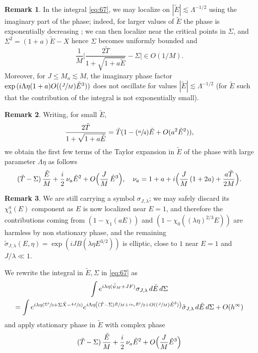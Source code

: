 \documentclass[JEP,XML,SOM,Unicode,NoEqCountersInSection,NoFloatCountersInSection,published]{cedram}
\newcommand{\Psfrac}[2]{(\sfrac{#1}{#2})}
\theoremstyle{plain}
\theoremstyle{definition}
\newtheorem{rmq}{Remark}[section]
\begin{document}
\begin{rmq}\label{rmkimagphase}
In the integral \eqref{eq:67}, we may localize on $|{\tilde E}|\lesssim\Lambda^{-1/2}$ using the imaginary part of the phase; indeed, for larger values of ${\tilde E}$ the phase is exponentially decreasing ; we can then localize near the critical points in $\Sigma$, and $\Sigma^{2}=(1+a){\tilde E}-X$ hence $\Sigma$ becomes uniformly bounded and
\[
\frac 1M\biggl|\frac{2\tilde T}{1+\sqrt{1+a{\tilde E}}}-\Sigma\biggr| \in O(1/M).
\]
Moreover, for $J\leq M_a\lesssim M$, the imaginary phase factor $\exp{(i\Lambda\eta(1+a)O(\Psfrac JM {\tilde E}^3)})$ does not oscillate for values $|{\tilde E}|\lesssim \Lambda^{-1/2}$ (\ie for ${\tilde E}$ such that the contribution of the integral is not exponentially small).
\end{rmq}
\begin{rmq}
Writing, for small ${\tilde E}$,
\[
\frac{2\tilde T}{1+\sqrt{1+a{\tilde E}}}= \tilde T(1-\Psfrac a4 {\tilde E}+O(a^2{\tilde E}^2)),
\]
we obtain the first few terms of the Taylor expansion in $\tilde E$ of the phase with large parameter $\Lambda \eta$ as follows
\[
(\tilde T-\Sigma)\,\frac {\tilde E}M+\frac i2\, \nu_a {\tilde E}^2+O\Bigl(\frac JM\, {\tilde E}^3\Bigl),\quad \nu_a=1+a+i \Bigl(\frac JM\,(1+2a)+\frac{a \tilde T}{2M}\Bigr).
\]
\end{rmq}
\begin{rmq}
We are still carrying a symbol $\sigma_{J,\lambda}$; we may safely discard its $\chi_{\lambda}^{a}(E)$ component as $E$ is now localized near $E=1$, and therefore the contributions coming from $(1-\chi_{1}(aE))$ and $(1-\chi_0((\lambda\eta)^{2/3}E))$ are harmless by non stationary phase, and the remaining $\tilde \sigma_{J,\lambda}(E,\eta)=\exp(i J B(\lambda \eta E^{3/2}))$ is elliptic, close to $1$ near $E=1$ and $J/\lambda \ll 1$.
\end{rmq}
We rewrite the integral in ${\tilde E},\Sigma$ in \eqref{eq:67} as
\begin{multline*}
\int e^{i \lambda\eta (\tilde\psi_{M}+JF)} \sigma_{J,\lambda}\,d{\tilde E} \,d\Sigma\\ = \int e^{i \lambda\eta (\sfrac{\Sigma^3}{3}+\Sigma \tilde X-\sfrac{4J}{3})} e^{i \Lambda \eta \left((\tilde T-\Sigma) \sfrac {\tilde E} M + \sfrac{i\nu_a {\tilde E}^{2}}{2}+O(\Psfrac J M {\tilde E}^{3})\right)}  \tilde \sigma_{J,\lambda }\,d{\tilde E} \,d\Sigma +O(h^{\infty})
\end{multline*}
and apply stationary phase in ${\tilde E}$ with complex phase
\[
(\tilde T-\Sigma)\, \frac {\tilde E} M + \frac i2\, \nu_a {\tilde E}^{2}+O\Bigl(\frac J M {\tilde E}^{3}\Bigr)
\]
\end{document}
